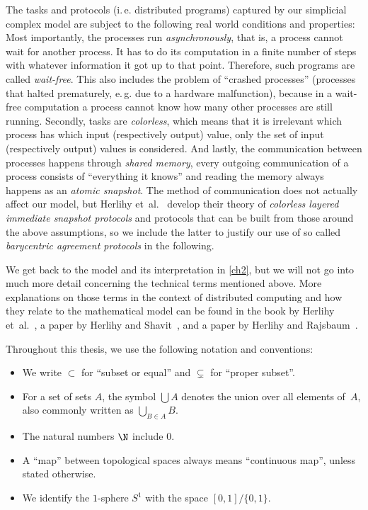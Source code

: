 The tasks and protocols (i.\,e. distributed programs) captured by our simplicial
complex model are subject to the following real world conditions and properties:
Most importantly, the processes run \emph{asynchronously}, that is, a process
cannot wait for another process. It has to do its computation in a finite number
of steps with whatever information it got up to that point. Therefore, such
programs are called \emph{wait-free}. This also includes the problem of
\enquote{crashed processes} (processes that halted prematurely, e.\,g. due to
a hardware malfunction), because in a wait-free computation a process cannot
know how many other processes are still running. Secondly, tasks are
\emph{colorless}, which means that it is irrelevant which process has which
input (respectively output) value, only the set of input (respectively output)
values is considered. And lastly, the communication between processes happens
through \emph{shared memory}, every outgoing communication of a process consists
of \enquote{everything it knows} and reading the memory always happens as an
\emph{atomic snapshot}. The method of communication does not actually affect
our model, but Herlihy et~al.~\cite{bookc:herlihyetal13} develop their theory of
\emph{colorless layered immediate snapshot protocols} and protocols that can be
built from those around the above assumptions, so we include the latter to
justify our use of so called \emph{barycentric agreement protocols} in the
following.

We get back to the model and its interpretation in \cref{ch2}, but we will not
go into much more detail concerning the technical terms mentioned above.
More explanations on those terms in the context of distributed computing and how
they relate to the mathematical model can be found in the book by
Herlihy et~al.~\cite{bookc:herlihyetal13}, a paper by
Herlihy and Shavit~\cite{paper:herlihyshavit99}, and a paper by
Herlihy and Rajsbaum~\cite{paper:herlihyrajsbaum03}.

\bigskip
Throughout this thesis, we use the following notation and conventions:
\begin{itemize}
    \item
        We write $\subset$ for \enquote{subset or equal}
        and $\subsetneq$ for \enquote{proper subset}.
        
    \item
        For a set of sets $A$, the symbol $\bigcup A$ denotes the
        union over all elements of~$A$, also commonly written as
        $\bigcup_{B\in A} B$.
        
    \item
        The natural numbers $\N$ include $0$.
        
    \item
        A \enquote{map} between topological spaces always means
        \enquote{continuous map}, unless stated otherwise.
        
    \item
        We identify the $1$-sphere $S^1$ with the space $[0,1]/\{0,1\}$.
\end{itemize}

